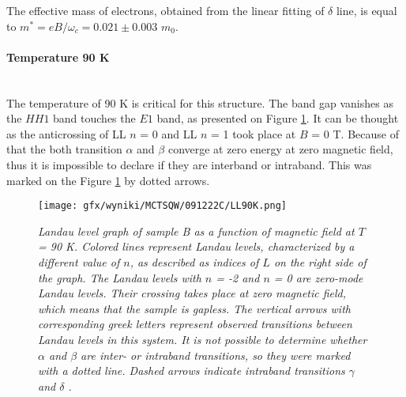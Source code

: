 \documentclass[titlepage,a4paper]{book}
\newcommand{\myparagraph}[1]{\paragraph{#1}\mbox{}\\}
\begin{document}
The effective mass of electrons, obtained from the linear fitting of $\delta$ line, is equal to $m^* = eB/\omega_c = 0.021 \pm 0.003$ $m_0$.

\clearpage
\myparagraph{Temperature 90 K}
The temperature of 90 K is critical for this structure. The band gap vanishes as the $HH1$ band touches the $E1$ band, as presented on Figure \ref{fig:LL_SQW_90K}. It can be thought as the anticrossing of LL $n$ = 0 and LL $n$ = 1 took place at $B$ = 0 T. Because of that the both transition $\alpha$ and $\beta$ converge at zero energy at zero magnetic field, thus it is impossible to declare if they are interband or intraband. This was marked on the Figure \ref{fig:LL_SQW_90K} by dotted arrows.
\begin{figure}[ht]
	\centering
	\texttt{[image: gfx/wyniki/MCTSQW/091222C/LL90K.png]}
	\vspace{-10pt}
	\caption{\textit{Landau level graph of sample B as a function of magnetic field at $T$ = 90 K. Colored lines represent Landau levels, characterized by a different value of $n$, as described as indices of $L$ on the right side of the graph. The Landau levels with $n$ = -2 and $n$ = 0 are zero-mode Landau levels. Their crossing takes place at zero magnetic field, which means that the sample is gapless. The vertical arrows with corresponding greek letters represent observed transitions between Landau levels in this system. It is not possible to determine whether $\alpha$ and $\beta$ are inter- or intraband transitions, so they were marked with a dotted line. Dashed arrows indicate intraband transitions $\gamma$ and $\delta$ .}}
	\label{fig:LL_SQW_90K}
\end{figure}
\end{document}
